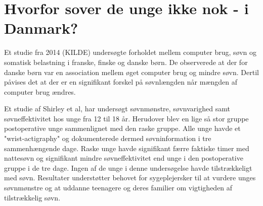 \section{Hvorfor sover de unge ikke nok - i Danmark?}
\label{sec:hvorforSoverDeUngeIkkeNok}

Et studie fra 2014 (KILDE) undersøgte forholdet mellem computer brug, søvn og somatisk belastning i franske, finske og danske børn. De observerede at der for danske børn var en association mellem øget computer brug og mindre søvn. Dertil påvises det at der er en signifikant forskel på søvnlængden når mængden af computer brug ændres.


Et studie af Shirley et al, har undersøgt søvnmønstre, søvnvarighed samt søvneffektivitet hos unge fra 12 til 18 år. Herudover blev en lige så stor gruppe postoperative unge sammenlignet med den raske gruppe.  
Alle unge havde et "wrist-actigraphy" og dokumenterede dermed søvninformation i tre sammenhængende dage. 
Raske unge havde signifikant færre faktiske timer med nattesøvn og signifikant mindre søvneffektivitet end unge i den postoperative gruppe i de tre dage. Ingen af de unge i denne undersøgelse havde tilstrækkeligt med søvn. 
Resultater understøtter behovet for sygeplejersker til at vurdere unges søvnmønstre og at uddanne teenagere og deres familier om vigtigheden af tilstrækkelig søvn. 



